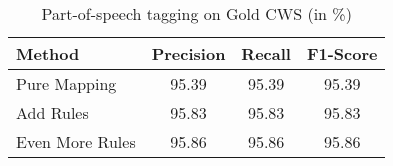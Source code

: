 \begin{table}[htbp!]
    \centering
    \begin{tabular}{lccc}
    \toprule
        Method          & Precision     & Recall   & F1-Score \\
    \midrule
        Pure Mapping    & 95.39         & 95.39    & 95.39    \\
        Add Rules       & 95.83         & 95.83    & 95.83    \\
        Even More Rules & 95.86         & 95.86    & 95.86    \\
    \bottomrule
    \end{tabular}
\caption{Part-of-speech tagging on Gold CWS (in \%)}
\label{tab:pos_on_gold_cws}
\end{table}